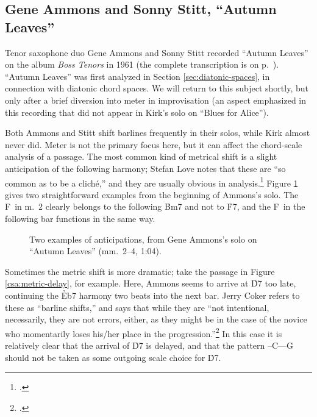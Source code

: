 \subsection{Gene Ammons and Sonny Stitt, “Autumn Leaves”}
\label{subsec:tenors-autumn-leaves}

Tenor saxophone duo Gene Ammons and Sonny Stitt recorded ``Autumn Leaves'' on
the album \emph{Boss Tenors} in 1961 (the complete transcription is on
p.~\pageref{transcription:autumn-leaves}). ``Autumn Leaves'' was first
analyzed in Section \ref{sec:diatonic-spaces}, in connection with diatonic
chord spaces. We will return to this subject shortly, but only after a brief
diversion into meter in improvisation (an aspect emphasized in this recording
that did not appear in Kirk's solo on ``Blues for Alice'').

Both Ammons and Stitt shift barlines frequently in their solos, while Kirk
almost never did. Meter is not the primary focus here, but it can affect the
chord-scale analysis of a passage. The most common kind of metrical
shift is a slight anticipation of the following harmony; Stefan Love notes
that these are ``so common as to be a cliché,'' and they are usually obvious
in analysis.\footcite[51]{love:2013} Figure \ref{csa:anticipation-simple}
gives two straightforward examples from the beginning of Ammons's solo. The
F\sharp\ in m.~2 clearly belongs to the following \h{Bm7} and not to \h{F7},
and the F\nat\ in the following bar functions in the same way.

\begin{figure}[tbp]
  \caption[Two examples of anticipations, from Gene Ammons's solo on ``Autumn
    Leaves.'']{Two examples of anticipations, from Gene Ammons's solo on
    ``Autumn Leaves'' (mm.~2--4, 1:04).}
  \label{csa:anticipation-simple}
\end{figure}

Sometimes the metric shift is more dramatic; take the passage in Figure
\ref{csa:metric-delay}, for example. Here, Ammons seems to arrive at \h{D7}
too late, continuing the \h{Eb7} harmony two beats into the next bar. Jerry
Coker refers to these as ``barline shifts,'' and says that while they are
``not intentional, necessarily, they are not errors, either, as they might be
in the case of the novice who momentarily loses his/her place in the
progression.''\footcite[83]{coker:elements} In this case it is relatively
clear that the arrival of \h{D7} is delayed, and that the pattern
\Dflat--C--\Bflat--G should not be taken as some outgoing scale choice for
\h{D7}.

